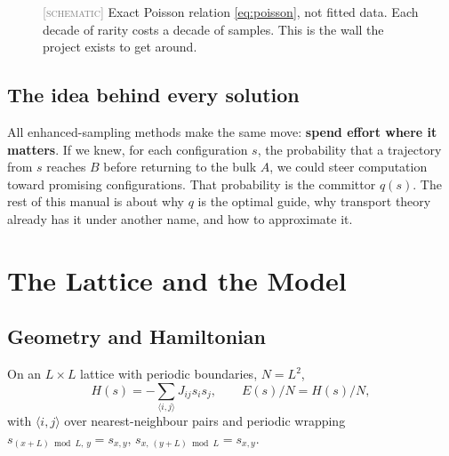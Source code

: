 \documentclass[11pt,a4paper]{article}
\newcommand{\SCHEM}{\textcolor{gray}{\footnotesize[\textsc{schematic}]}}
\begin{document}
\begin{figure}[H]\centering
{}
\caption{\SCHEM{} Exact Poisson relation \eqref{eq:poisson}, not fitted data. Each decade of
rarity costs a decade of samples. This is the wall the project exists to get around.}
\label{fig:poisson}
\end{figure}

\subsection{The idea behind every solution}
All enhanced-sampling methods make the same move: \textbf{spend effort where it matters}. If we
knew, for each configuration $s$, the probability that a trajectory from $s$ reaches $B$ before
returning to the bulk $A$, we could steer computation toward promising configurations. That
probability is the committor $q(s)$. The rest of this manual is about why $q$ is the optimal guide,
why transport theory already has it under another name, and how to approximate it.

\section{The Lattice and the Model}\label{sec:lattice}

\subsection{Geometry and Hamiltonian}
On an $L\times L$ lattice with periodic boundaries, $N=L^2$,
\begin{equation}
H(s)=-\sum_{\langle i,j\rangle}J_{ij}s_is_j,\qquad E(s)/N = H(s)/N,
\end{equation}
with $\langle i,j\rangle$ over nearest-neighbour pairs and periodic wrapping
$s_{(x+L)\bmod L,\,y}=s_{x,y}$, $s_{x,\,(y+L)\bmod L}=s_{x,y}$.
\end{document}
